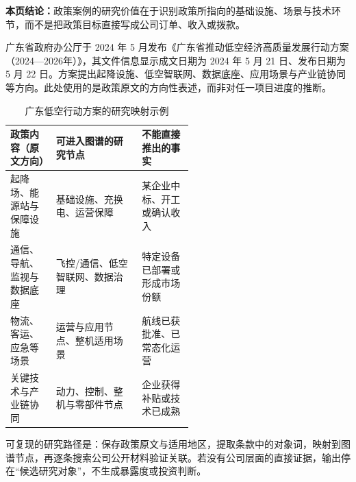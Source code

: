 \textbf{本页结论：}政策案例的研究价值在于识别政策所指向的基础设施、场景与技术环节，而不是把政策目标直接写成公司订单、收入或拨款。

广东省政府办公厅于 2024 年 5 月发布《广东省推动低空经济高质量发展行动方案（2024—2026年）》，其文件信息显示成文日期为 2024 年 5 月 21 日、发布日期为 5 月 22 日\cite{wty-gd-plan}。方案提出起降设施、低空智联网、数据底座、应用场景与产业链协同等方向。此处使用的是政策原文的方向性表述，而非对任一项目进度的推断。

\begin{table}[htbp]
\centering
\caption{广东低空行动方案的研究映射示例}
\label{tab:wty-policy-case}
\small
\begin{tabularx}{\linewidth}{p{0.25\linewidth}X p{0.28\linewidth}}
\toprule
政策内容（原文方向） & 可进入图谱的研究节点 & 不能直接推出的事实 \\
\midrule
起降场、能源站与保障设施 & 基础设施、充换电、运营保障 & 某企业中标、开工或确认收入 \\
通信、导航、监视与数据底座 & 飞控/通信、低空智联网、数据治理 & 特定设备已部署或形成市场份额 \\
物流、客运、应急等场景 & 运营与应用节点、整机适用场景 & 航线已获批准、已常态化运营 \\
关键技术与产业链协同 & 动力、控制、整机与零部件节点 & 企业获得补贴或技术已成熟 \\
\bottomrule
\end{tabularx}
\end{table}

可复现的研究路径是：保存政策原文与适用地区，提取条款中的对象词，映射到图谱节点，再逐条搜索公司公开材料验证关联。若没有公司层面的直接证据，输出停在“候选研究对象”，不生成暴露度或投资判断。
